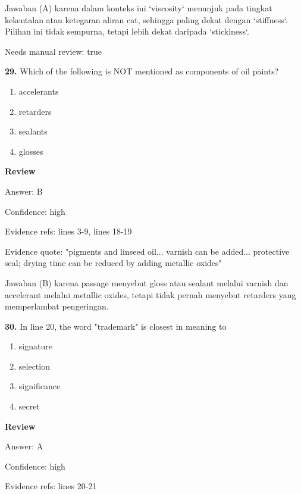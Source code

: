 \documentclass[12pt]{article}
\begin{document}
Jawaban (A) karena dalam konteks ini `viscosity` menunjuk pada tingkat kekentalan atau ketegaran aliran cat, sehingga paling dekat dengan `stiffness`. Pilihan ini tidak sempurna, tetapi lebih dekat daripada `stickiness`.\par
Needs manual review: true\par
\endgroup
\par
\vspace{0.25\baselineskip}
\noindent\textbf{29.} Which of the following is NOT mentioned as components of oil paints?
\begin{enumerate}[label=(\Alph*),leftmargin=*,itemsep=0.2em]
\item accelerants
\item retarders
\item sealants
\item glosses
\end{enumerate}
\par
\begingroup
\setlength{\parskip}{0pt}
\setlength{\parindent}{0pt}
\textbf{Review}\par
Answer: B\par
Confidence: high\par
Evidence refs: lines 3-9, lines 18-19\par
Evidence quote: "pigments and linseed oil... varnish can be added... protective seal; drying time can be reduced by adding metallic oxides"\par
Jawaban (B) karena passage menyebut gloss atau sealant melalui varnish dan accelerant melalui metallic oxides, tetapi tidak pernah menyebut retarders yang memperlambat pengeringan.\par
\endgroup
\par
\vspace{0.25\baselineskip}
\noindent\textbf{30.} In line 20, the word "trademark" is closest in meaning to
\begin{enumerate}[label=(\Alph*),leftmargin=*,itemsep=0.2em]
\item signature
\item selection
\item significance
\item secret
\end{enumerate}
\par
\begingroup
\setlength{\parskip}{0pt}
\setlength{\parindent}{0pt}
\textbf{Review}\par
Answer: A\par
Confidence: high\par
Evidence refs: lines 20-21\par
\end{document}
